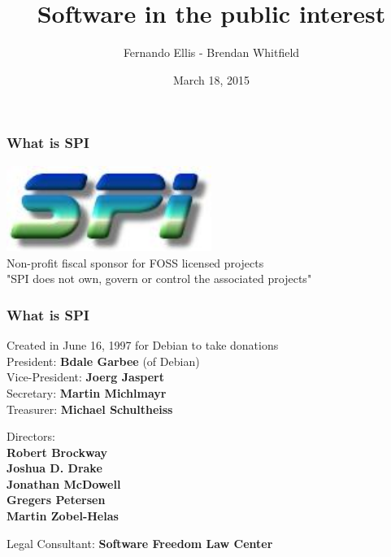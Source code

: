 \documentclass[10pt, compress]{beamer}
\title{Software in the public interest}
\subtitle{}
\date{March 18, 2015}
\author{Fernando Ellis - Brendan Whitfield}
\institute{}
\begin{document}
\maketitle


\begin{frame}[fragile]
  \frametitle{What is SPI}
  \begin{center}
    \includegraphics[width=0.5\textwidth]{images/spi.jpg}
    \\ \vspace{4mm}
    Non-profit fiscal sponsor for FOSS licensed projects
    \\ \vspace{4mm}
    "SPI does not own, govern or control the associated projects"
    \end{center}
\end{frame}

\begin{frame}[fragile]
  \frametitle{What is SPI}
  \begin{center}
    Created in June 16, 1997 for Debian to take donations
    \\ \vspace{4mm}
    President: \textbf{Bdale Garbee} (of Debian)
    \\
    Vice-President: \textbf{Joerg Jaspert}
    \\
    Secretary: \textbf{Martin Michlmayr}
    \\
    Treasurer: \textbf{Michael Schultheiss}

    \vspace{4mm}
    Directors:\\
    \textbf{Robert Brockway}\\
    \textbf{Joshua D. Drake}\\
    \textbf{Jonathan McDowell}\\
    \textbf{Gregers Petersen}\\
    \textbf{Martin Zobel-Helas}
    
    \vspace{4mm}
    Legal Consultant: \textbf{Software Freedom Law Center}
  \end{center}
\end{frame}
\end{document}
